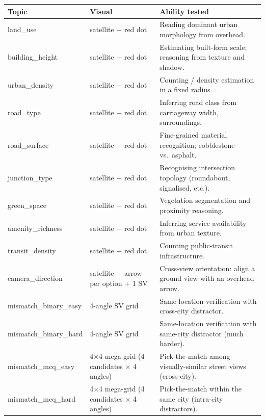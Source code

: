 \documentclass[11pt,a4paper]{article}
\begin{document}
\renewcommand{\arraystretch}{1.2}
\begin{tabularx}{\linewidth}{@{}>{\ttfamily\small}l p{4.6cm} X@{}}
\toprule
\textnormal{\textbf{Topic}} & \textbf{Visual} & \textbf{Ability tested} \\
\midrule
land\_use         & satellite + red dot              & Reading dominant urban morphology from overhead. \\
building\_height  & satellite + red dot              & Estimating built-form scale; reasoning from texture and shadow. \\
urban\_density    & satellite + red dot              & Counting / density estimation in a fixed radius. \\
road\_type        & satellite + red dot              & Inferring road class from carriageway width, surroundings. \\
road\_surface     & satellite + red dot              & Fine-grained material recognition; cobblestone vs.\ asphalt. \\
junction\_type    & satellite + red dot              & Recognising intersection topology (roundabout, signalised, etc.). \\
green\_space      & satellite + red dot              & Vegetation segmentation and proximity reasoning. \\
amenity\_richness & satellite + red dot              & Inferring service availability from urban texture. \\
transit\_density  & satellite + red dot              & Counting public-transit infrastructure. \\
camera\_direction & satellite + arrow per option + 1 SV & Cross-view orientation: align a ground view with an overhead arrow. \\
mismatch\_binary\_easy & 4-angle SV grid             & Same-location verification with cross-city distractor. \\
mismatch\_binary\_hard & 4-angle SV grid             & Same-location verification with same-city distractor (much harder). \\
mismatch\_mcq\_easy    & 4$\times$4 mega-grid (4 candidates $\times$ 4 angles) & Pick-the-match among visually-similar street views (cross-city). \\
mismatch\_mcq\_hard    & 4$\times$4 mega-grid (4 candidates $\times$ 4 angles) & Pick-the-match within the same city (intra-city distractors). \\
\bottomrule
\end{tabularx}
\end{document}
